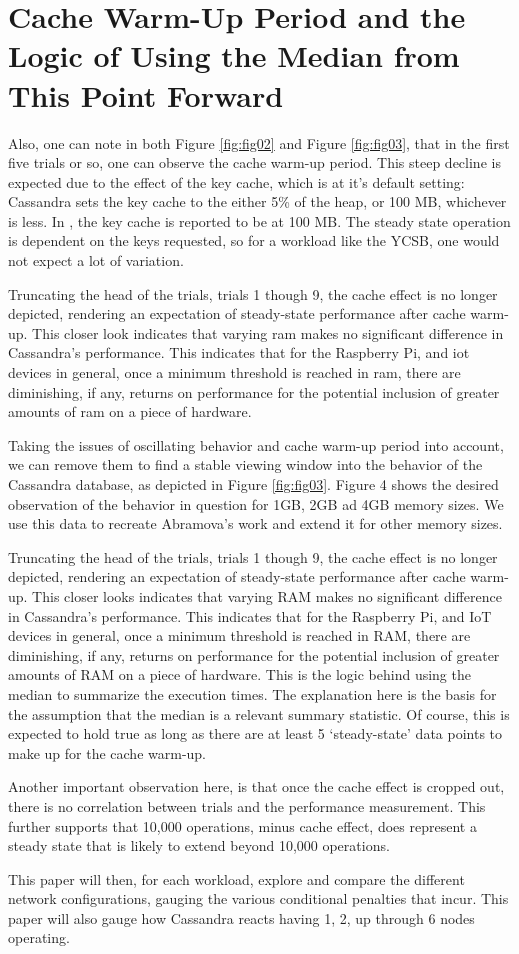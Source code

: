 \section{Cache Warm-Up Period and the Logic of Using the Median from This Point Forward}

Also, one can note in both Figure \ref{fig:fig02} and Figure \ref{fig:fig03}, that in the first five trials or so, one can observe the cache warm-up period.  This steep decline is expected due to the effect of the key cache, which is at it’s default setting: Cassandra sets the key cache to the either 5\% of the heap, or 100 MB, whichever is less.  In \cite{Abramova2014}, the key cache is reported to be at 100 MB.  The steady state operation is dependent on the keys requested, so for a workload like the YCSB, one would not expect a lot of variation.

Truncating the head of the trials, trials 1 though 9, the cache effect is no longer depicted, rendering an expectation of steady-state performance after cache warm-up.  This closer look indicates that varying \gls{ram} makes no significant difference in Cassandra’s performance.  This indicates that for the Raspberry Pi, and \gls{iot} devices in general, once a minimum threshold is reached in \gls{ram}, there are diminishing, if any, returns on performance for the potential inclusion of greater amounts of \gls{ram} on a piece of hardware. 

Taking the issues of oscillating behavior and cache warm-up period into account, we can remove them to find a stable viewing window into the behavior of the Cassandra database, as depicted in Figure \ref{fig:fig03}. Figure 4 shows the desired observation of the behavior in question for 1GB, 2GB ad 4GB memory sizes. We use this data to recreate Abramova’s work and extend it for other memory sizes.

Truncating the head of the trials, trials 1 though 9, the cache effect is no longer depicted, rendering an expectation of steady-state performance after cache warm-up.  This closer looks indicates that varying RAM makes no significant difference in Cassandra’s performance.  This indicates that for the Raspberry Pi, and IoT devices in general, once a minimum threshold is reached in RAM, there are diminishing, if any, returns on performance for the potential inclusion of greater amounts of RAM on a piece of hardware. 
This is the logic behind using the median to summarize the execution times.  The explanation here is the basis for the assumption that the median is a relevant summary statistic.  Of course, this is expected to hold true as long as there are at least 5 ‘steady-state’ data points to make up for the cache warm-up.

Another important observation here, is that once the cache effect is cropped out, there is no correlation between trials and the performance measurement.  This further supports that 10,000 operations, minus cache effect, does represent a steady state that is likely to extend beyond 10,000 operations.

This paper will then, for each workload, explore and compare the different network configurations, gauging the various conditional penalties that incur.  This paper will also gauge how Cassandra reacts having 1, 2, up through 6 nodes operating.  

